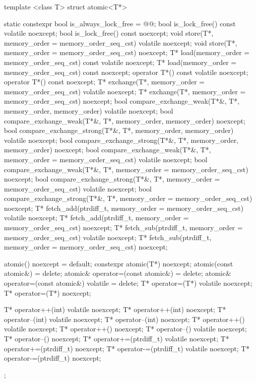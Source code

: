 \begin{codeblock}
{  template <class T> struct atomic<T*> {
    static constexpr bool is_always_lock_free = @@;
    bool is_lock_free() const volatile noexcept;
    bool is_lock_free() const noexcept;
    void store(T*, memory_order = memory_order_seq_cst) volatile noexcept;
    void store(T*, memory_order = memory_order_seq_cst) noexcept;
    T* load(memory_order = memory_order_seq_cst) const volatile noexcept;
    T* load(memory_order = memory_order_seq_cst) const noexcept;
    operator T*() const volatile noexcept;
    operator T*() const noexcept;
    T* exchange(T*, memory_order = memory_order_seq_cst) volatile noexcept;
    T* exchange(T*, memory_order = memory_order_seq_cst) noexcept;
    bool compare_exchange_weak(T*&, T*, memory_order, memory_order) volatile noexcept;
    bool compare_exchange_weak(T*&, T*, memory_order, memory_order) noexcept;
    bool compare_exchange_strong(T*&, T*, memory_order, memory_order) volatile noexcept;
    bool compare_exchange_strong(T*&, T*, memory_order, memory_order) noexcept;
    bool compare_exchange_weak(T*&, T*, memory_order = memory_order_seq_cst) volatile noexcept;
    bool compare_exchange_weak(T*&, T*, memory_order = memory_order_seq_cst) noexcept;
    bool compare_exchange_strong(T*&, T*, memory_order = memory_order_seq_cst) volatile noexcept;
    bool compare_exchange_strong(T*&, T*, memory_order = memory_order_seq_cst) noexcept;
    T* fetch_add(ptrdiff_t, memory_order = memory_order_seq_cst) volatile noexcept;
    T* fetch_add(ptrdiff_t, memory_order = memory_order_seq_cst) noexcept;
    T* fetch_sub(ptrdiff_t, memory_order = memory_order_seq_cst) volatile noexcept;
    T* fetch_sub(ptrdiff_t, memory_order = memory_order_seq_cst) noexcept;

    atomic() noexcept = default;
    constexpr atomic(T*) noexcept;
    atomic(const atomic&) = delete;
    atomic& operator=(const atomic&) = delete;
    atomic& operator=(const atomic&) volatile = delete;
    T* operator=(T*) volatile noexcept;
    T* operator=(T*) noexcept;

    T* operator++(int) volatile noexcept;
    T* operator++(int) noexcept;
    T* operator--(int) volatile noexcept;
    T* operator--(int) noexcept;
    T* operator++() volatile noexcept;
    T* operator++() noexcept;
    T* operator--() volatile noexcept;
    T* operator--() noexcept;
    T* operator+=(ptrdiff_t) volatile noexcept;
    T* operator+=(ptrdiff_t) noexcept;
    T* operator-=(ptrdiff_t) volatile noexcept;
    T* operator-=(ptrdiff_t) noexcept;
  };
}
\end{codeblock}

